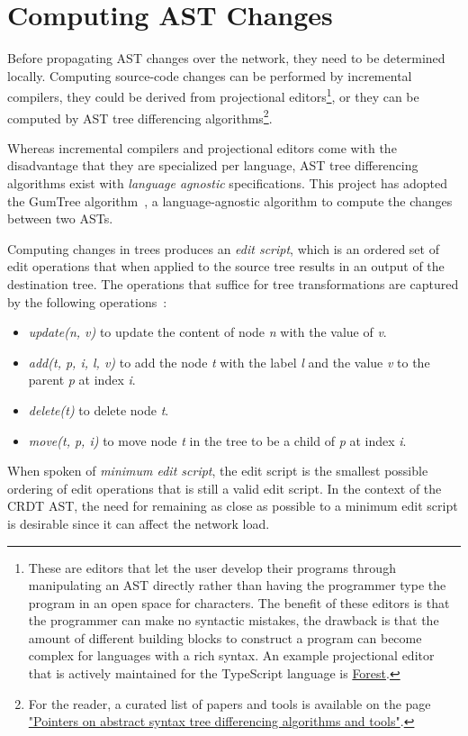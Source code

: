 \section{Computing AST Changes}\label{sec:computing-ast-changes}

Before propagating AST changes over the network, they need to be determined locally.
Computing source-code changes can be performed by incremental compilers, they could be derived from projectional
editors\footnote{These are editors that let the user develop their programs through manipulating an AST directly
rather than having the programmer type the program in an open space for characters.
The benefit of these editors is that the programmer can make no syntactic mistakes, the drawback is that the amount of
different building blocks to construct a program can become complex for languages with a rich syntax.
An example projectional editor that is actively maintained for the TypeScript language is
\href{https://github.com/tehwalris/forest}{Forest}.
}, or they can be computed by AST tree differencing algorithms\footnote{For the reader, a curated list of papers and
tools is available on the page \href{https://www.monperrus.net/martin/tree-differencing}{"Pointers on abstract syntax tree
differencing algorithms and tools"}.}.

Whereas incremental compilers and projectional editors come with the disadvantage that they are specialized per
language, AST tree differencing algorithms exist with \emph{language agnostic} specifications.
This project has adopted the GumTree algorithm~\cite{10.1145/2642937.2642982}, a language-agnostic algorithm to compute
the changes between two ASTs.

Computing changes in trees produces an \emph{edit script}, which is an ordered set of edit operations that when applied to
the source tree results in an output of the destination tree.
The operations that suffice for tree transformations are captured by the following operations~\cite{10.1145/235968.233366}:
\begin{itemize}
    \item \textit{update(n, v)} to update the content of node \textit{n} with the value of \textit{v}.

    \item \textit{add(t, p, i, l, v)} to add the node \textit{t} with the label \textit{l} and the value \textit{v} to
    the parent \textit{p} at index \textit{i}.

    \item \textit{delete(t)} to delete node \textit{t}.

    \item \textit{move(t, p, i)} to move node \textit{t} in the tree to be a child of \textit{p} at index \textit{i}.
\end{itemize}
When spoken of \emph{minimum edit script}, the edit script is the smallest possible ordering of edit operations that is
still a valid edit script.
In the context of the CRDT AST, the need for remaining as close as possible to a minimum edit script is desirable since
it can affect the network load.

